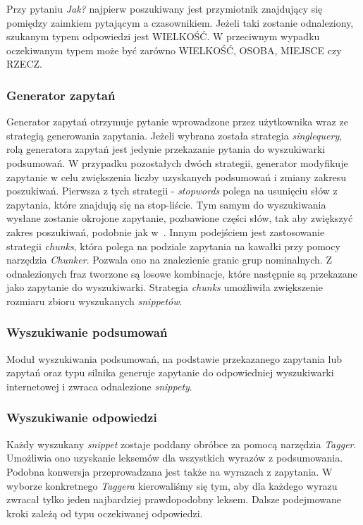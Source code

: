 Przy pytaniu \emph{Jak?} najpierw poszukiwany jest przymiotnik znajdujący się pomiędzy zaimkiem pytającym a czasownikiem. Jeżeli taki zostanie odnaleziony, szukanym typem odpowiedzi jest WIELKOŚĆ. W przeciwnym wypadku oczekiwanym typem może być zarówno WIELKOŚĆ, OSOBA, MIEJSCE czy RZECZ. 

\subsubsection{Generator zapytań}
Generator zapytań otrzymuje pytanie wprowadzone przez użytkownika wraz ze strategią generowania zapytania. Jeżeli wybrana została strategia \emph{singlequery}, rolą generatora zapytań jest jedynie przekazanie pytania do wyszukiwarki podsumowań. W przypadku pozostałych dwóch strategii, generator modyfikuje zapytanie w celu  zwiększenia liczby uzyskanych podsumowań i zmiany zakresu poszukiwań. Pierwsza z tych strategii - \emph{stopwords} polega na usunięciu słów z zapytania, które znajdują się na stop-liście. Tym samym do wyszukiwania wysłane zostanie okrojone zapytanie, pozbawione części słów, tak aby zwiększyć zakres poszukiwań, podobnie jak w~\cite{brill2002analysis}. Innym podejściem jest zastosowanie strategii \emph{chunks}, która polega na podziale zapytania na kawałki przy pomocy narzędzia \emph{Chunker}. Pozwala ono na znalezienie granic grup nominalnych. Z odnalezionych fraz tworzone są losowe kombinacje, które następnie są przekazane jako zapytanie do wyszukiwarki. Strategia \emph{chunks} umożliwiła zwiększenie rozmiaru zbioru wyszukanych \emph{snippetów}.
 
\subsubsection{Wyszukiwanie podsumowań}
Moduł wyszukiwania podsumowań, na podstawie przekazanego zapytania lub zapytań oraz typu silnika generuje zapytanie do odpowiedniej wyszukiwarki internetowej i zwraca odnalezione \emph{snippety}.

\subsubsection{Wyszukiwanie odpowiedzi}

Każdy wyszukany \emph{snippet} zostaje poddany obróbce za pomocą narzędzia \emph{Tagger}. Umożliwia ono uzyskanie leksemów dla wszystkich wyrazów z podsumowania. Podobna konwersja przeprowadzana jest także na wyrazach z zapytania. W wyborze konkretnego \emph{Taggera} kierowaliśmy się tym, aby dla każdego wyrazu zwracał tylko jeden najbardziej prawdopodobny leksem. Dalsze podejmowane kroki zależą od typu oczekiwanej odpowiedzi.

